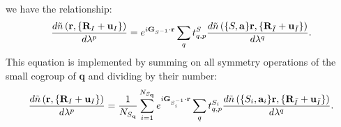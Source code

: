 \documentclass[12pt,a4paper,twoside]{report}
\begin{document}
we have the relationship:
\begin{equation}
{d \tilde n\left({\bf r}, \{{\bf R}_I + {\bf u}_I\}\right) \over d \lambda^p} = e^{i{\bf G}_{S^{-1}} \cdot {\bf r}}
\sum_q t_{q,p}^S {d \tilde n\left(\{S,{\bf a}\} {\bf r}, \{{\bf R}_{\bar I} + {\bf u}_{\bar I}\}\right) \over d \lambda^q}. 
\end{equation}
This equation is implemented by summing on all symmetry operations of the small cogroup of
{\bf q} and dividing by their number:
\begin{equation}
{d \tilde n\left({\bf r}, \{{\bf R}_I + {\bf u}_I\}\right) \over d \lambda^p} = {1\over N_{S_{\bf q}}} \sum_{i=1}^{N_{S_{\bf q}}} e^{i{\bf G}_{S_i^{-1}} \cdot {\bf r}}
\sum_q t_{q,p}^{S_i} {d \tilde n\left(\{S_i,{\bf a}_i\} {\bf r}, \{{\bf R}_{\bar I} + {\bf u}_{\bar I}\}\right) \over d \lambda^q}.
\label{drho_irrep}
\end{equation}
\end{document}
